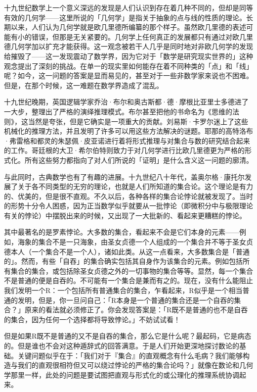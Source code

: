 \documentclass[
  12pt,
  twoside,
  openright,
  oldfontcommands,
]{memoir}
\begin{document}
十九世纪数学上一个意义深远的发现是人们认识到存在着几种不同的，但却是同等有效的几何学------这里所说的「几何学」是指关于抽象的点与线的性质的理论。长期以来，人们认为几何学就是欧几里德所编纂的那个样子。虽然欧几里德的表述可能有小的错误，但那是无关紧要的。几何学上任何真正的发展都只有通过对欧几里德几何学加以扩充才能获得。这一观念被若干人几乎是同时地对非欧几何学的发现给摧毁了------这一发现震动了数学界，因为它对于「数学是研究现实世界的」这种观念提出了深刻的挑战。在单一的现实里如何能存在着不同种类的「点」和「线」呢？如今，这一问题的答案是显而易见的，甚至对于一些非数学家来说也不困难。但是，在那个时候，这一难题在数学界造成了混乱。

十九世纪晚期，英国逻辑学家乔治·布尔和奥古斯都·德·摩根比亚里士多德进了一大步，整理出了严格的演绎推理模式。布尔甚至把他的书命名为《思维的法则》，这当然是夸张，但是它确实是一项重大的贡献。刘易斯·卡罗尔迷上了这些机械化的推理方法，并且发明了许多可以用这些方法解决的谜题。耶那的高特洛布·弗雷格和都灵的朱瑟佩·皮亚诺进行着将形式推理与对集合与数的研究结合起来的工作。哥廷根的大卫·希尔伯特则致力于对几何学进行比欧几里德更为严格的形式化。所有这些努力都指向了对人们所说的「证明」是什么含义这一问题的廓清。

与此同时，古典数学也有了有趣的进展。十九世纪八十年代，盖奥尔格·康托尔发展了关于各不同类型的无穷的理论，也就是人们所知道的集合论。这个理论是有力的、优美的，但是很不直观。不久以后，各种各样的集合论悖论就被发现了。当时的形势十分令人困惑，因为正当数学似乎就要从一批悖论（即微积分中与极限理论有关的悖论）中摆脱出来的时候，又出现了一大批新的、看起来更糟糕的悖论。

其中最著名的是罗素悖论。大多数的集合，看起来不会是它们本身的元素------例如，海象的集合不是一只海象，由圣女贞德一个人组成的一个集合并不等于圣女贞德本人（一个集合不是一个人），诸如此类。从这一点看来，大多数集合是「普通的」。然而，有些「自吞」的集合确实包括其自身作为该集合的元素。例如包括所有集合的集合，或包括除圣女贞德之外的一切事物的集合等等。显然，每一个集合不是普通的便是自吞的。不可能有一个集合是兼而有之的。现在，没有什么能阻止我们发明一个R：一个包括所有普通集合的集合，乍看起来，R似乎是一个相当普通的发明，但是，你一旦问自己：「R本身是一个普通的集合还是一个自吞的集合？」原来的看法就必须修正了。你会发现答案是：「R既不是普通的也不是自吞的集合，因为任何一个选择都将导致悖论。」不妨试试看！

但是如果R既不是普通的又不是自吞的集合，那么它是什么呢？最起码，它是病态的。但是谁也不会对这种遁辞式的回答满意。于是人们开始更深地探讨数论的基础。关键问题似乎在于：「我们对于『集合』的直观概念有什么毛病？我们能够构造与我们的直观很相符但又可以绕过悖论的严格的集合论吗？」就像在数论和几何学那里一样，此处的问题是要试图把直观与形式化的或公理化的推理系统协调起来。
\end{document}
